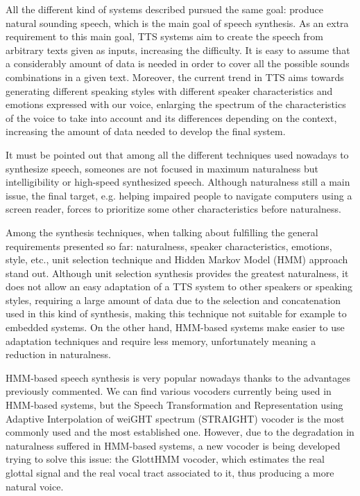 All the different kind of systems described pursued the same goal: produce natural sounding speech, which is the main goal of speech synthesis. As an extra requirement to this main goal, TTS systems aim to create the speech from arbitrary texts given as inputs, increasing the difficulty. It is easy to assume that a considerably amount of data is needed in order to cover all the possible sounds combinations in a given text. Moreover, the current trend in TTS aims towards generating different speaking styles with different speaker characteristics and emotions expressed with our voice, enlarging the spectrum of the characteristics of the voice to take into account and its differences depending on the context, increasing the amount of data needed to develop the final system. 

It must be pointed out that among all the different techniques used nowadays to synthesize speech, someones are not focused in maximum naturalness but intelligibility or high-speed synthesized speech. Although naturalness still a main issue, the final target, e.g. helping impaired people to navigate computers using a screen reader, forces to prioritize some other characteristics before naturalness. 

Among the synthesis techniques, when talking about fulfilling the general requirements presented so far: naturalness, speaker characteristics, emotions, style, etc., unit selection technique and Hidden Markov Model (HMM) approach stand out. Although unit selection synthesis provides the greatest naturalness, it does not allow an easy adaptation of a TTS system to other speakers or speaking styles, requiring a large amount of data due to the selection and concatenation used in this kind of synthesis, making this technique not suitable for example to embedded systems. On the other hand, HMM-based systems make easier to use adaptation techniques and require less memory, unfortunately meaning a reduction in naturalness.

HMM-based speech synthesis is very popular nowadays thanks to the advantages previously commented. We can find various vocoders currently being used in HMM-based systems, but the Speech Transformation and Representation using Adaptive Interpolation of weiGHT spectrum (STRAIGHT) vocoder is the most commonly used and the most established one. However, due to the degradation in naturalness suffered in HMM-based systems, a new vocoder is being developed trying to solve this issue: the GlottHMM vocoder, which estimates the real glottal signal and the real vocal tract associated to it, thus producing a more natural voice. 

